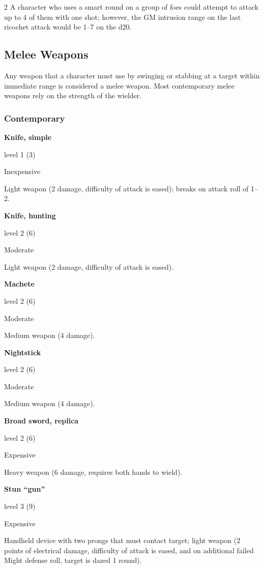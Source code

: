 \begin{multicols}{2}
A character who uses a smart round on a group of foes could attempt to attack up to 4 of them with one shot; however, the GM intrusion range on the last ricochet attack would be 1–7 on the d20.

\subsection{Melee Weapons}

Any weapon that a character must use by swinging or stabbing at a target within immediate range is considered a melee weapon. Most contemporary melee weapons rely on the strength of the wielder.

\subsubsection{Contemporary}

\textbf{Knife, simple} 

level 1 (3) 

Inexpensive 

Light weapon (2 damage, difficulty of attack is eased); breaks on attack roll of 1–2. 

\textbf{Knife, hunting} 

level 2 (6) 

Moderate 

Light weapon (2 damage, difficulty of attack is eased). 

\textbf{Machete} 

level 2 (6) 

Moderate 

Medium weapon (4 damage). 

\textbf{Nightstick} 

level 2 (6) 

Moderate 

Medium weapon (4 damage). 

\textbf{Broad sword, replica} 

level 2 (6)

Expensive 

Heavy weapon (6 damage, requires both hands to wield). 

\textbf{Stun “gun”} 

level 3 (9) 

Expensive 

Handheld device with two prongs that must contact target; light weapon (2 points of electrical damage, difficulty of attack is eased, and on additional failed Might defense roll, target is dazed 1 round).


\end{multicols}
